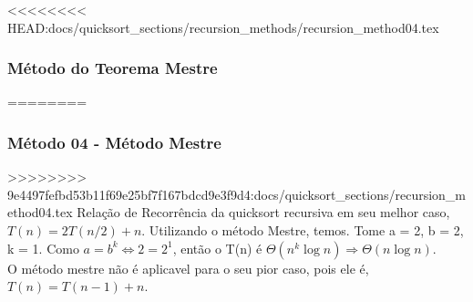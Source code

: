 <<<<<<<< HEAD:docs/quicksort_sections/recursion_methods/recursion_method04.tex
\subsubsection{Método do Teorema Mestre}
========
\subsubsection{Método 04 - Método Mestre}
>>>>>>>> 9e4497fefbd53b11f69e25bf7f167bdcd9e3f9d4:docs/quicksort_sections/recursion_method04.tex
Relação de Recorrência da quicksort recursiva em seu melhor caso, $T(n) = 2T(n/2) + n$. Utilizando o método Mestre, temos.
Tome a = 2, b = 2, k = 1. Como $a = b^k \Leftrightarrow 2 = 2^1$, então o T(n) é $\Theta(n^k \log{n}) \Rightarrow \Theta(n \log{n})$. \\
O método mestre não é aplicavel para o seu pior caso, pois ele é, $T(n) = T(n-1) + n$.
